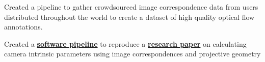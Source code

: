 \documentclass[]{plushcv}
\begin{document}
\begin{minipage}[t]{0.70\textwidth}
    \begin{tightemize}
        \sectionsep
        \item Created a pipeline to gather crowdsourced
        image correspondence data from users distributed throughout the world
        to create a dataset of high quality optical flow annotations.
        \item Created a
        \textbf{\href{https://github.com/johanos/pollefeys-self-calibration-and-metric-reconstruction}{software pipeline}}
        to reproduce a
        \textbf{\href{https://people.inf.ethz.ch/pomarc/pubs/PollefeysIJCV99.pdf}{research paper}}
        on calculating camera intrinsic parameters using image correspondences and projective geometry

    \end{tightemize}
    \sectionsep


    \sectionsep






\end{minipage}
\end{document}
